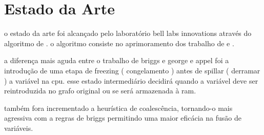 \section{Estado da Arte}

o estado da arte foi alcançado pelo laboratório bell labs innovations através do algoritmo de  \textcite{irc}.
o algoritmo consiste no aprimoramento dos trabalho de \textcite{briggs} e \textcite{chaitin}.

a diferença mais aguda entre o trabalho de briggs e george e appel foi a introdução de uma etapa de freezing ( congelamento ) antes de spillar ( derramar ) a variável na cpu. esse estado intermediário decidirá quando a variável deve ser reintroduzida no grafo original ou se será armazenada à ram.

também fora incrementado a heurística de coalescência, tornando-o mais agressiva com a regras de briggs permitindo uma maior eficácia na fusão de variáveis. 


